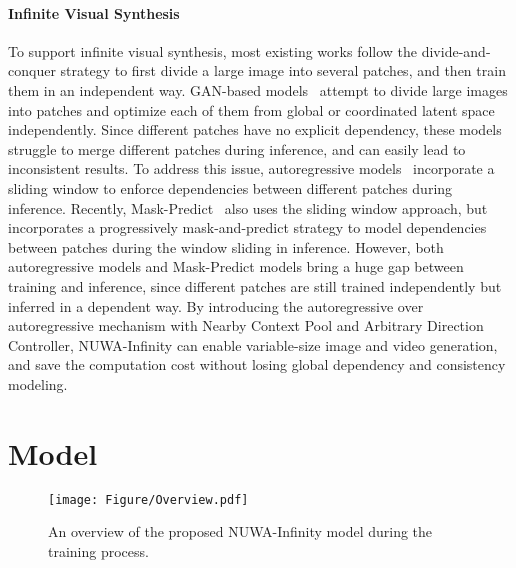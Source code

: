 \documentclass{article}
\begin{document}
\paragraph{Infinite Visual Synthesis}
To support infinite visual synthesis, most existing works follow the divide-and-conquer strategy to first divide a large image into several patches, and then train them in an independent way. GAN-based models~\cite{struskiLocoGANLocallyConvolutional2022,skorokhodovAligningLatentImage2021} attempt to divide large images into patches and optimize each of them from global or coordinated latent space independently. Since different patches have no explicit dependency, these models struggle to merge different patches during inference, and can easily lead to inconsistent results. To address this issue, autoregressive models~\cite{esserTamingTransformersHighResolution2021,changMaskGITMaskedGenerative2022} incorporate a sliding window to enforce dependencies between different patches during inference. Recently, Mask-Predict~\cite{choXLXMERTPaintCaption2020, zhangM6ufcUnifyingMultimodal2021, changMaskGITMaskedGenerative2022} also uses the sliding window approach, but incorporates a progressively mask-and-predict strategy to model dependencies between patches during the window sliding in inference. However, both autoregressive models and Mask-Predict models bring a huge gap between training and inference, since different patches are still trained independently but inferred in a dependent way. By introducing the autoregressive over autoregressive mechanism with Nearby Context Pool and Arbitrary Direction Controller, NUWA-Infinity can enable variable-size image and video generation, and save the computation cost without losing global dependency and consistency modeling.






















\section{Model}\label{sec:method}
 \begin{figure}[tbp]
    \centering
    \texttt{[image: Figure/Overview.pdf]}
    \caption{An overview of the proposed NUWA-Infinity model during the training process.}
    \label{fig:architecture}
\end{figure}
\end{document}
